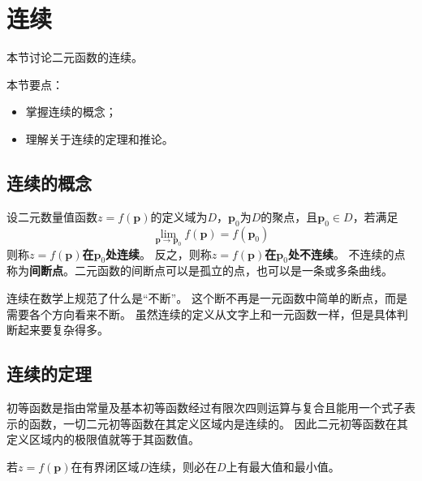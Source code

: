 \section{连续}

本节讨论二元函数的连续。

本节要点：
\begin{itemize}
    \item 掌握连续的概念；
    \item 理解关于连续的定理和推论。
\end{itemize}

\subsection{连续的概念}

\begin{definition}[连续]
设二元数量值函数$z=f\left( \boldsymbol{p} \right) $的定义域为$D$，$\boldsymbol{p}_0$为$D$的聚点，且$\boldsymbol{p}_0\in D$，若满足
\[
\underset{\boldsymbol{p}\rightarrow \boldsymbol{p}_0}{\lim}f\left( \boldsymbol{p} \right) =f\left( \boldsymbol{p}_0 \right)
\]
则称{\bf $z=f\left( \boldsymbol{p} \right) $在$\boldsymbol{p}_0$处连续}。
反之，则称{\bf $z=f\left( \boldsymbol{p} \right) $在$\boldsymbol{p}_0$处不连续}。
不连续的点称为{\bf 间断点}。二元函数的间断点可以是孤立的点，也可以是一条或多条曲线。
\end{definition}

连续在数学上规范了什么是“不断”。
这个断不再是一元函数中简单的断点，而是需要各个方向看来不断。
虽然连续的定义从文字上和一元函数一样，但是具体判断起来要复杂得多。

\subsection{连续的定理}

\begin{theorem}[初等函数连续定理]
初等函数是指由常量及基本初等函数经过有限次四则运算与复合且能用一个式子表示的函数，一切二元初等函数在其定义区域内是连续的。
因此二元初等函数在其定义区域内的极限值就等于其函数值。
\end{theorem}

\begin{theorem}[最值定理]
若$z=f\left( \boldsymbol{p} \right) $在有界闭区域$D$连续，则必在$D$上有最大值和最小值。
\end{theorem}

